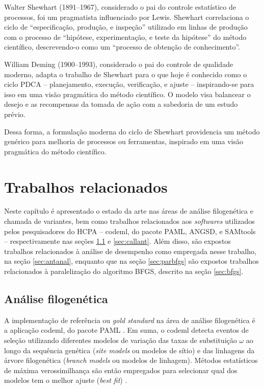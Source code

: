\documentclass[cic,tc]{iiufrgs}
\begin{document}
Walter Shewhart (1891--1967), considerado o pai do controle estatístico de
processos, foi um pragmatista influenciado por Lewis. Shewhart correlaciona o
ciclo de ``especificação, produção, e inspeção'' utilizado em linhas de
produção com o processo de ``hipótese, experimentação, e teste da hipótese'' do
método científico, descrevendo-o como um ``processo de obtenção de
conhecimento''. 

William Deming (1900--1993), considerado o pai do controle de qualidade
moderno, adapta o trabalho de Shewhart para o que hoje é conhecido como o ciclo
PDCA -- planejamento, execução, verificação, e ajuste -- inspirando-se para
isso em uma visão pragmática do método científico. O modelo visa balancear o
desejo e as recompensas da tomada de ação com a sabedoria de um estudo prévio.

Dessa forma, a formulação moderna do ciclo de Shewhart providencia um método
genérico para melhoria de processos ou ferramentas, inspirado em uma visão
pragmática do método científico.


%
%
%
%

\chapter{Trabalhos relacionados}
\label{chap:anteriores}

Neste capítulo é apresentado o estado da arte nas áreas de análise filogenética
e chamada de variantes, bem como trabalhos relacionados aos \textit{softwares}
utilizados pelos pesquisadores do HCPA -- codeml, do pacote PAML, ANGSD, e
SAMtools -- respectivamente nas seções \ref{sec:filoant} e \ref{sec:callant}.
Além disso, são expostos trabalhos relacionados à análise de desempenho como
empregada nesse trabalho, na seção \ref{sec:antanal}, enquanto que na seção
\ref{sec:parbfgs} são expostos trabalhos relacionados à paralelização do
algoritmo BFGS, descrito na seção \ref{sec:bfgs}.

\section{Análise filogenética}
\label{sec:filoant}

A implementação de referência ou \textit{gold standard} na área de análise
filogenética é a aplicação codeml, do pacote PAML \cite{valle2014optimization}.
Em suma, o codeml detecta eventos de seleção utilizando diferentes modelos de
variação das taxas de substituição $\omega$ ao longo da sequência genética
(\textit{site models} ou modelos de sítio) e das linhagens da árvore
filogenética (\textit{branch models} ou modelos de linhagem). Métodos
estatísticos de máxima verossimilhança são então empregados para selecionar
qual dos modelos tem o melhor ajuste (\textit{best fit}) \cite{yang2007paml}.
\end{document}
